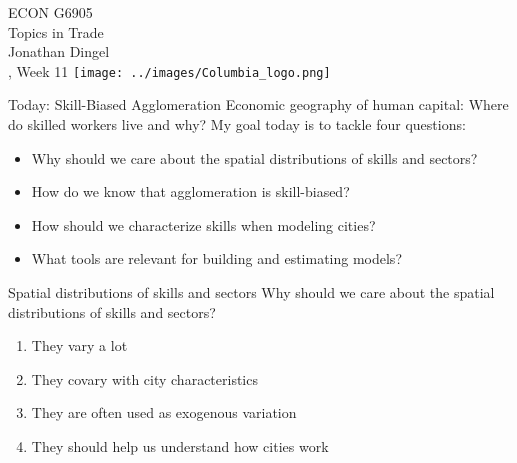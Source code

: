 \documentclass[11pt,notes=hide,aspectratio=169]{beamer}
\begin{document}
\begin{frame}[plain]
\begin{center}
\large
\textcolor{columbiadarkblue}{ECON G6905\\
Topics in Trade\\ 
Jonathan Dingel\\
\semester, Week 11}
\vfill 
\texttt{[image: ../images/Columbia\_logo.png]}
\end{center}
\end{frame}
\begin{frame}{Today: Skill-Biased Agglomeration}
Economic geography of human capital:
Where do skilled workers live and why?
\medskip
My goal today is to tackle four questions:
\begin{itemize}
	\item Why should we care about the spatial distributions of skills and sectors?
	\item How do we know that agglomeration is skill-biased?
	\item How should we characterize skills when modeling cities?
	\item What tools are relevant for building and estimating models?
\end{itemize}
\end{frame}
\begin{frame}{Spatial distributions of skills and sectors} 
Why should we care about the spatial distributions of skills and sectors?
\begin{enumerate}
	\item They vary a lot
	\item They covary with city characteristics
	\item They are often used as exogenous variation 
	\item They should help us understand how cities work
\end{enumerate}
\end{frame}
\end{document}
